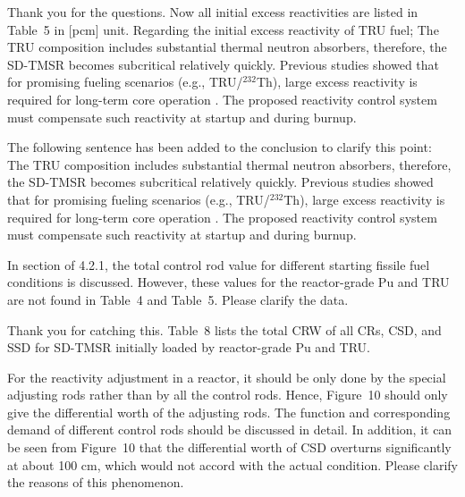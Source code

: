 \documentclass[answers,11pt]{exam}
\begin{document}
\begin{questions}
\begin{solution}
	Thank you for the questions. Now all initial excess reactivities are listed in Table~5 in [pcm] unit. Regarding the initial excess reactivity of TRU fuel; The TRU composition includes substantial thermal neutron absorbers, therefore, the SD-TMSR becomes subcritical relatively quickly. Previous studies showed that for promising fueling scenarios (e.g., TRU/$^{232}$Th), large excess reactivity is required for long-term core operation \cite{ashraf2020Strategies,betzler2017assessment,rykhlevskii_fuel_2019}. The proposed reactivity control system must compensate such reactivity at startup and during burnup.
	
	The following sentence has been added to the conclusion to clarify this point:\\
	
	The TRU composition includes substantial thermal neutron absorbers, therefore, the SD-TMSR becomes subcritical relatively quickly. Previous studies showed that for promising fueling scenarios (e.g., TRU/$^{232}$Th), large excess reactivity is required for long-term core operation \cite{ashraf2020Strategies,betzler2017assessment,rykhlevskii_fuel_2019}. The proposed reactivity control system must compensate such reactivity at startup and during burnup.
	
	
\end{solution}

\question In section of 4.2.1, the total control rod value for different starting fissile fuel conditions is discussed. However, these values for the reactor-grade Pu and TRU are not found in Table~4 and Table~5. Please clarify the data.
\begin{solution}
	
	Thank you for catching this. Table~8 lists the total CRW of all CRs, CSD, and SSD for SD-TMSR initially loaded by reactor-grade Pu and TRU. 
	
	
\end{solution}

\question For the reactivity adjustment in a reactor, it should be only done by the special adjusting rods rather than by all the control rods. Hence, Figure~10 should only give the differential worth of the adjusting rods. The function and corresponding demand of different control rods should be discussed in detail. In addition, it can be seen from Figure~10 that the differential worth of CSD overturns significantly at about 100 cm, which would not accord with the actual condition. Please clarify the reasons of this phenomenon.
\begin{solution}
	

\end{solution}
\end{questions}
\end{document}

